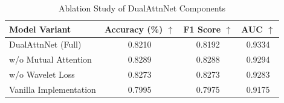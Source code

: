 \documentclass[12pt]{article}
\begin{document}
\begin{table}[htbp]
    \caption{Ablation Study of DualAttnNet Components}
    \label{tab:ablation}
    \centering
    \begin{tabular}{lccc}
        \toprule
        \textbf{Model Variant} & \textbf{Accuracy (\%)} $\uparrow$ & \textbf{F1 Score} $\uparrow$ & \textbf{AUC} $\uparrow$ \\
        \midrule
        DualAttnNet (Full)     & 0.8210                            & 0.8192                       & 0.9334                  \\
        \cmidrule{1-4}
        w/o Mutual Attention   & 0.8289                            & 0.8288                       & 0.9294                  \\
        w/o Wavelet Loss       & 0.8273                            & 0.8273                       & 0.9283                  \\
        Vanilla Implementation & 0.7995                            & 0.7975                       & 0.9175                  \\
        \bottomrule
    \end{tabular}
    \vspace{2pt}

\end{table}
\end{document}
